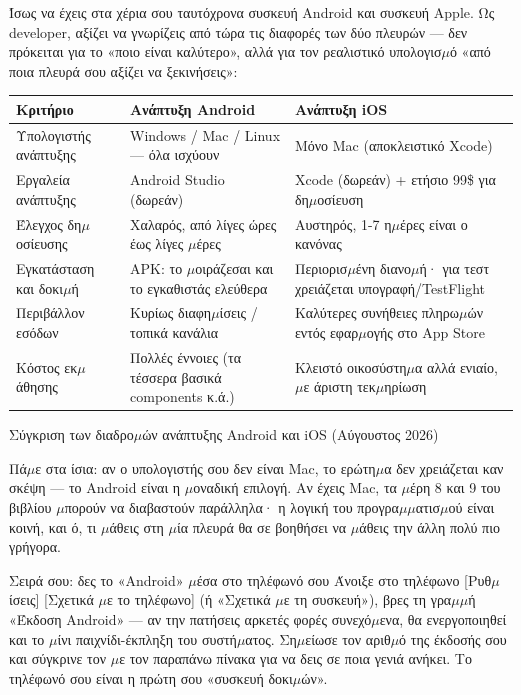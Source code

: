 Ίσως να έχεις στα χέρια σου ταυτόχρονα συσκευή Android και συσκευή Apple. Ως developer, αξίζει να γνωρίζεις από τώρα τις διαφορές των δύο πλευρών — δεν πρόκειται για το «ποιο είναι καλύτερο», αλλά για τον ρεαλιστικό υπολογισ$\mu$ό «από ποια πλευρά σου αξίζει να ξεκινήσεις»:

\begin{center}
\begin{tabularx}{\linewidth}{|X|X|X|}
\hline
\textbf{Κριτήριο} & \textbf{Ανάπτυξη Android} & \textbf{Ανάπτυξη iOS} \tabularnewline
\hline
Υπολογιστής ανάπτυξης & Windows / Mac / Linux — όλα ισχύουν & Μόνο Mac (αποκλειστικό Xcode) \tabularnewline
Εργαλεία ανάπτυξης & Android Studio (δωρεάν) & Xcode (δωρεάν) + ετήσιο 99\$ για δη$\mu$οσίευση \tabularnewline
Έλεγχος δη$\mu$οσίευσης & Χαλαρός, από λίγες ώρες έως λίγες $\mu$έρες & Αυστηρός, 1-7 η$\mu$έρες είναι ο κανόνας \tabularnewline
Εγκατάσταση και δοκι$\mu$ή & APK: το $\mu$οιράζεσαι και το εγκαθιστάς ελεύθερα & Περιορισ$\mu$ένη διανο$\mu$ή· για τεστ χρειάζεται υπογραφή/TestFlight \tabularnewline
Περιβάλλον εσόδων & Κυρίως διαφη$\mu$ίσεις / τοπικά κανάλια & Καλύτερες συνήθειες πληρω$\mu$ών εντός εφαρ$\mu$ογής στο App Store \tabularnewline
Κόστος εκ$\mu$άθησης & Πολλές έννοιες (τα τέσσερα βασικά components κ.ά.) & Κλειστό οικοσύστη$\mu$α αλλά ενιαίο, $\mu$ε άριστη τεκ$\mu$ηρίωση \tabularnewline
\hline
\end{tabularx}
\end{center}

\begin{center}\small\color{gray}Σύγκριση των διαδρο$\mu$ών ανάπτυξης Android και iOS (Αύγουστος 2026)\end{center}

Πά$\mu$ε στα ίσια: αν ο υπολογιστής σου δεν είναι Mac, το ερώτη$\mu$α δεν χρειάζεται καν σκέψη — το Android είναι η $\mu$οναδική επιλογή. Αν έχεις Mac, τα $\mu$έρη 8 και 9 του βιβλίου $\mu$πορούν να διαβαστούν παράλληλα· η λογική του προγρα$\mu$$\mu$ατισ$\mu$ού είναι κοινή, και ό, τι $\mu$άθεις στη $\mu$ία πλευρά θα σε βοηθήσει να $\mu$άθεις την άλλη πολύ πιο γρήγορα.

\begin{tcbpractice}{Σειρά σου: δες το «Android» $\mu$έσα στο τηλέφωνό σου}
Άνοιξε στο τηλέφωνο [Ρυθ$\mu$ίσεις] [Σχετικά $\mu$ε το τηλέφωνο] (ή «Σχετικά $\mu$ε τη συσκευή»), βρες τη γρα$\mu$$\mu$ή «Έκδοση Android» — αν την πατήσεις αρκετές φορές συνεχό$\mu$ενα, θα ενεργοποιηθεί και το $\mu$ίνι παιχνίδι-έκπληξη του συστή$\mu$ατος. Ση$\mu$είωσε τον αριθ$\mu$ό της έκδοσής σου και σύγκρινε τον $\mu$ε τον παραπάνω πίνακα για να δεις σε ποια γενιά ανήκει. Το τηλέφωνό σου είναι η πρώτη σου «συσκευή δοκι$\mu$ών».

\end{tcbpractice}

